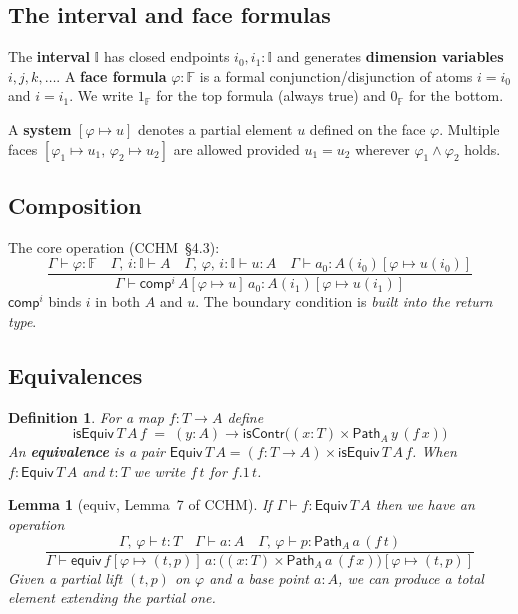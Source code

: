 \documentclass[11pt, a4paper]{article}
\newtheorem{lemma}[theorem]{Lemma}
\newtheorem{definition}[theorem]{Definition}
\newcommand{\III}{\mathbb{I}}
\newcommand{\FFF}{\mathbb{F}}
\newcommand{\pt}[1]{\mathsf{#1}}
\newcommand{\compT}{\pt{comp}}
\newcommand{\equivT}{\pt{equiv}}
\newcommand{\EquivT}{\pt{Equiv}}
\newcommand{\isContrT}{\pt{isContr}}
\newcommand{\isEquivT}{\pt{isEquiv}}
\newcommand{\PathT}{\pt{Path}}
\newcommand{\sys}[2]{[#1 \mapsto #2]}
\newcommand{\io}{i_0}
\newcommand{\ii}{i_1}
\newcommand{\topF}{1_{\mathbb{F}}}
\newcommand{\botF}{0_{\mathbb{F}}}
\begin{document}
\subsection{The interval and face formulas}

The \textbf{interval} $\III$ has closed endpoints $\io, \ii : \III$ and
generates \textbf{dimension variables} $i, j, k, \ldots$. A
\textbf{face formula} $\varphi : \FFF$ is a formal conjunction/disjunction of
atoms $i = \io$ and $i = \ii$. We write $\topF$ for the top formula (always
true) and $\botF$ for the bottom.

A \textbf{system} $\sys{\varphi}{u}$ denotes a partial element $u$ defined on
the face $\varphi$. Multiple faces $[\varphi_1 \mapsto u_1,\, \varphi_2
\mapsto u_2]$ are allowed provided $u_1 = u_2$ wherever $\varphi_1 \wedge
\varphi_2$ holds.

\subsection{Composition}

The core operation (CCHM~\S4.3):
\[
\frac{\Gamma \vdash \varphi : \FFF \quad
      \Gamma,\, i : \III \vdash A \quad
      \Gamma,\, \varphi,\, i : \III \vdash u : A \quad
      \Gamma \vdash a_0 : A(\io)\sys{\varphi}{u(\io)}}
     {\Gamma \vdash \compT^i\, A\sys{\varphi}{u}\, a_0 : A(\ii)\sys{\varphi}{u(\ii)}}
\]
$\compT^i$ binds $i$ in both $A$ and $u$. The boundary condition is
\emph{built into the return type}.

\subsection{Equivalences}

\begin{definition}
  For a map $f : T \to A$ define
  \[
    \isEquivT\, T\, A\, f \;=\;
      (y : A) \to \isContrT\bigl((x : T) \times \PathT_A\, y\, (f\, x)\bigr)
  \]
  An \textbf{equivalence} is a pair $\EquivT\, T\, A = (f : T \to A) \times
  \isEquivT\, T\, A\, f$. When $f : \EquivT\, T\, A$ and $t : T$ we write
  $f\,t$ for $f.1\,t$.
\end{definition}

\begin{lemma}[equiv, Lemma~7 of CCHM]\label{lem:equiv}
  If $\Gamma \vdash f : \EquivT\, T\, A$ then we have an operation
  \[
  \frac{\Gamma,\,\varphi \vdash t : T \quad
        \Gamma \vdash a : A \quad
        \Gamma,\,\varphi \vdash p : \PathT_A\, a\, (f\, t)}
       {\Gamma \vdash \equivT\, f\sys{\varphi}{(t,p)}\, a
          : \bigl((x : T) \times \PathT_A\, a\, (f\, x)\bigr)\sys{\varphi}{(t,p)}}
  \]
  Given a partial lift $(t,p)$ on $\varphi$ and a base point $a : A$, we can
  produce a total element extending the partial one.
\end{lemma}
\end{document}
